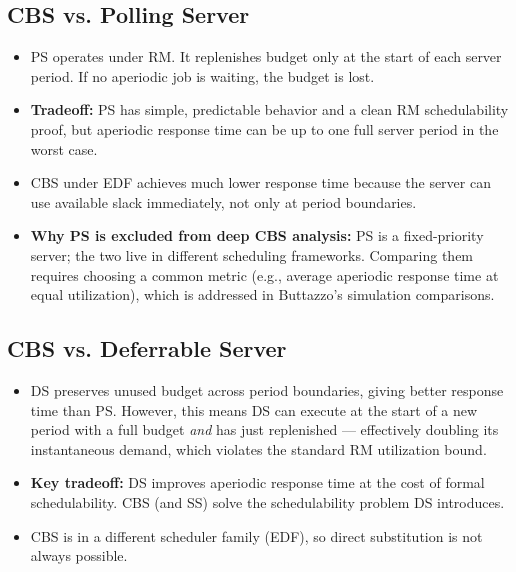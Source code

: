 \documentclass[conference]{IEEEtran}
\begin{document}
\subsection{CBS vs. Polling Server}
\begin{itemize}
  \item PS operates under RM. It replenishes budget only at the start
        of each server period. If no aperiodic job is waiting, the budget
        is lost.
  \item \textbf{Tradeoff:} PS has simple, predictable behavior and a
        clean RM schedulability proof, but aperiodic response time can be
        up to one full server period in the worst case.
  \item CBS under EDF achieves much lower response time because the
        server can use available slack immediately, not only at period
        boundaries.
  \item \textbf{Why PS is excluded from deep CBS analysis:} PS is a
        fixed-priority server; the two live in different scheduling
        frameworks. Comparing them requires choosing a common metric
        (e.g., average aperiodic response time at equal utilization),
        which is addressed in Buttazzo's simulation comparisons.
\end{itemize}

\subsection{CBS vs. Deferrable Server}
\begin{itemize}
  \item DS preserves unused budget across period boundaries, giving
        better response time than PS. However, this means DS can
        execute at the start of a new period with a full budget
        \emph{and} has just replenished --- effectively doubling its
        instantaneous demand, which violates the standard RM
        utilization bound.
  \item \textbf{Key tradeoff:} DS improves aperiodic response time
        at the cost of formal schedulability. CBS (and SS) solve the
        schedulability problem DS introduces.
  \item CBS is in a different scheduler family (EDF), so direct
        substitution is not always possible.
\end{itemize}
\end{document}
